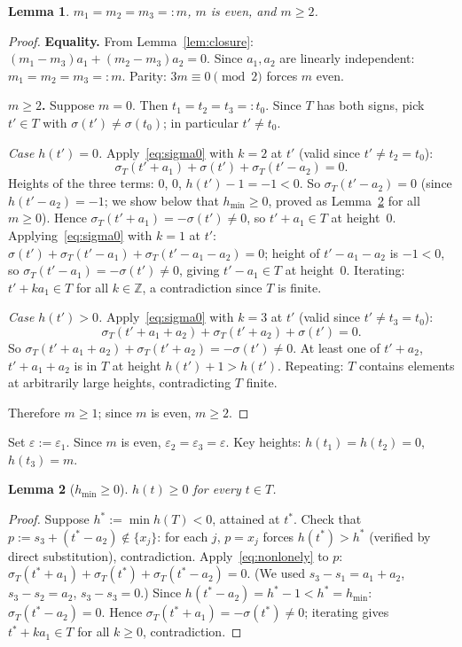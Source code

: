 \documentclass{article}
\newtheorem{lemma}{Lemma}
\begin{document}
\begin{lemma}\label{lem:n3m}
$m_1=m_2=m_3=:m$, $m$ is even, and $m\ge 2$.
\end{lemma}
\begin{proof}
\textbf{Equality.}
From Lemma~\ref{lem:closure}: $(m_1-m_3)a_1+(m_2-m_3)a_2=0$.
Since $a_1,a_2$ are linearly independent: $m_1=m_2=m_3=:m$.
Parity: $3m\equiv 0\pmod 2$ forces $m$ even.

\textbf{$m\ge 2$.}
Suppose $m=0$.  Then $t_1=t_2=t_3=:t_0$.
Since $T$ has both signs, pick $t'\in T$ with $\sigma(t')\ne\sigma(t_0)$; in particular $t'\ne t_0$.

\textit{Case $h(t')=0$.}
Apply~\eqref{eq:sigma0} with $k=2$ at $t'$ (valid since $t'\ne t_2=t_0$):
\[
  \sigma_T(t'+a_1)+\sigma(t')+\sigma_T(t'-a_2)=0.
\]
Heights of the three terms: $0$, $0$, $h(t')-1=-1<0$.
So $\sigma_T(t'-a_2)=0$ (since $h(t'-a_2)=-1$; we show below that $h_{\min}\ge 0$,
proved as Lemma~\ref{lem:betamin} for all $m\ge 0$).
Hence $\sigma_T(t'+a_1)=-\sigma(t')\ne 0$, so $t'+a_1\in T$ at height~$0$.
Applying~\eqref{eq:sigma0} with $k=1$ at $t'$:
$\sigma(t')+\sigma_T(t'-a_1)+\sigma_T(t'-a_1-a_2)=0$;
height of $t'-a_1-a_2$ is $-1<0$, so $\sigma_T(t'-a_1)=-\sigma(t')\ne 0$,
giving $t'-a_1\in T$ at height~$0$.
Iterating: $t'+ka_1\in T$ for all $k\in\mathbb{Z}$, a contradiction since $T$ is finite.

\textit{Case $h(t')>0$.}
Apply~\eqref{eq:sigma0} with $k=3$ at $t'$ (valid since $t'\ne t_3=t_0$):
\[
  \sigma_T(t'+a_1+a_2)+\sigma_T(t'+a_2)+\sigma(t')=0.
\]
So $\sigma_T(t'+a_1+a_2)+\sigma_T(t'+a_2)=-\sigma(t')\ne 0$.
At least one of $t'+a_2$, $t'+a_1+a_2$ is in $T$ at height $h(t')+1>h(t')$.
Repeating: $T$ contains elements at arbitrarily large heights, contradicting $T$ finite.

Therefore $m\ge 1$; since $m$ is even, $m\ge 2$.
\end{proof}

Set $\varepsilon:=\varepsilon_1$.  Since $m$ is even, $\varepsilon_2=\varepsilon_3=\varepsilon$.
Key heights: $h(t_1)=h(t_2)=0$, $h(t_3)=m$.

\begin{lemma}[$h_{\min}\ge 0$]\label{lem:betamin}
$h(t)\ge 0$ for every $t\in T$.
\end{lemma}
\begin{proof}
Suppose $h^*:=\min h(T)<0$, attained at $t^*$.
Check that $p:=s_3+(t^*-a_2)\notin\{x_j\}$: for each $j$, $p=x_j$ forces
$h(t^*)>h^*$ (verified by direct substitution), contradiction.
Apply~\eqref{eq:nonlonely} to $p$:
$\sigma_T(t^*+a_1)+\sigma_T(t^*)+\sigma_T(t^*-a_2)=0$.
(We used $s_3-s_1=a_1+a_2$, $s_3-s_2=a_2$, $s_3-s_3=0$.)
Since $h(t^*-a_2)=h^*-1<h^*=h_{\min}$: $\sigma_T(t^*-a_2)=0$.
Hence $\sigma_T(t^*+a_1)=-\sigma(t^*)\ne 0$; iterating gives $t^*+ka_1\in T$ for all $k\ge 0$, contradiction.
\end{proof}
\end{document}
